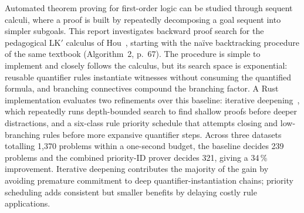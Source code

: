 Automated theorem proving for first-order logic can be studied
through sequent calculi, where a proof is built by repeatedly
decomposing a goal sequent into simpler subgoals. This report
investigates backward proof search for the pedagogical LK$'$ calculus
of Hou~\cite{hou2021fundamentals}, starting with the na\"ive
backtracking procedure of the same textbook (Algorithm~2, p.~67).
The procedure is simple to implement and closely follows the calculus,
but its search space is exponential: reusable quantifier rules
instantiate witnesses without consuming the quantified formula, and
branching connectives compound the branching factor. A Rust
implementation evaluates two refinements over this baseline: iterative
deepening~\cite{korf1985iterative}, which repeatedly runs depth-bounded
search to find shallow proofs before deeper distractions, and a
six-class rule priority schedule that attempts closing and low-branching
rules before more expansive quantifier steps. Across three datasets
totalling 1{,}370 problems within a one-second budget, the baseline
decides 239 problems and the combined priority-ID prover decides 321, giving
a 34\,\% improvement. Iterative deepening contributes the majority of
the gain by avoiding premature commitment to deep
quantifier-instantiation chains; priority scheduling adds consistent
but smaller benefits by delaying costly rule applications.

